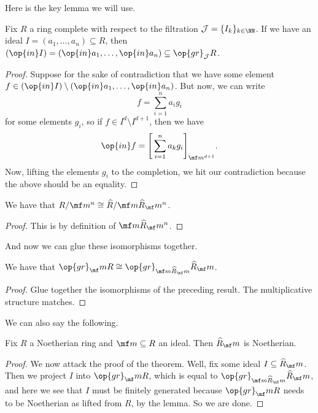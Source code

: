 Here is the key lemma we will use.
\begin{lemma}
	Fix $R$ a ring complete with respect to the filtration $\mathcal J=\{I_k\}_{k\in\NN}$. If we have an ideal $I=(a_1,\ldots,a_n)\subseteq R$, then $(\op{in}I)=(\op{in}a_1,\ldots,\op{in}a_n)\subseteq\op{gr}_\mathcal JR$.
\end{lemma}
\begin{proof}
	Suppose for the sake of contradiction that we have some element $f\in(\op{in}I)\setminus(\op{in}a_1,\ldots,\op{in}a_n)$. But now, we can write
	\[f=\sum_{i=1}^na_ig_i\]
	for some elements $g_i$, so if $f\in I^d\setminus I^{d+1}$, then we have
	\[\op{in}f=\Bigg[\sum_{i=1}^na_kg_i\Bigg]_{\mf m^{d+1}}.\]
	Now, lifting the elements $g_i$ to the completion, we hit our contradiction because the above should be an equality.
\end{proof}
\begin{lemma}
	We have that $R/\mf m^n\cong\widehat R/\mf m\widehat R_\mf m^n$.
\end{lemma}
\begin{proof}
	This is by definition of $\mf m\widehat R_\mf m^n$.
\end{proof}
And now we can glue these isomorphisms together.
\begin{corollary}
	We have that $\op{gr}_\mf mR\cong\op{gr}_{\mf m\widehat R_\mf m}\widehat R_\mf m$.
\end{corollary}
\begin{proof}
	Glue together the isomorphisms of the preceding result. The multiplicative structure matches.
\end{proof}
We can also say the following.
\begin{theorem}
	Fix $R$ a Noetherian ring and $\mf m\subseteq R$ an ideal. Then $\widehat R_\mf m$ is Noetherian.
\end{theorem}
\begin{proof}
	We now attack the proof of the theorem. Well, fix some ideal $I\subseteq\widehat R_\mf m$. Then we project $I$ into $\op{gr}_\mf mR$, which is equal to $\op{gr}_{\mf m\widehat R_\mf m}\widehat R_\mf m$, and here we see that $I$ must be finitely generated because $\op{gr}_\mf mR$ needs to be Noetherian as lifted from $R$, by the lemma. So we are done.
\end{proof}

